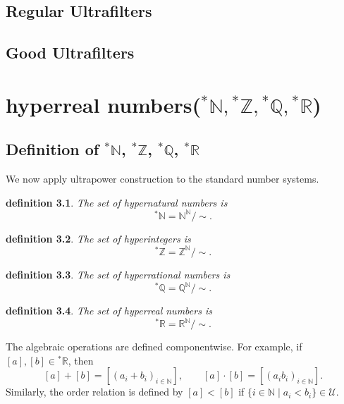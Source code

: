 \documentclass[10pt,a4paper]{book}
\newtheorem{definition}{definition}[section]
\begin{document}
\section{Regular Ultrafilters}

\section{Good Ultrafilters}


\chapter{hyperreal numbers($ {}^*\mathbb{N}  , {}^*\mathbb{Z}, {}^*\mathbb{Q} , {}^*\mathbb{R} $)  }


\section{Definition of ${}^\ast\mathbb{N}$, ${}^\ast\mathbb{Z}$, ${}^\ast\mathbb{Q}$,  ${}^\ast\mathbb{R}$ }


We now apply ultrapower  construction to the standard number systems.

\begin{definition}
    The set of hypernatural numbers is
    \[
        {}^\ast\mathbb{N}=\mathbb{N}^ \mathbb{N} /\sim.
    \]
\end{definition}

\begin{definition}
    The set of hyperintegers is
    \[
        {}^\ast\mathbb{Z}=\mathbb{Z}^ \mathbb{N} /\sim.
    \]
\end{definition}

\begin{definition}
    The set of hyperrational numbers is
    \[
        {}^\ast\mathbb{Q}=\mathbb{Q}^ \mathbb{N} /\sim.
    \]
\end{definition}

\begin{definition}
    The set of hyperreal numbers is
    \[
        {}^\ast\mathbb{R}=\mathbb{R}^ \mathbb{N} /\sim.
    \]
\end{definition}



The algebraic operations are defined componentwise. For example, if
$[a],[b]\in{}^\ast\mathbb{R}$, then
\[
    [a]+[b]=[(a_i+b_i)_{i\in \mathbb{N} }],
    \qquad
    [a]\cdot[b]=[(a_ib_i)_{i\in \mathbb{N} }].
\]
Similarly, the order relation is defined by
$
    [a]<[b]
$
if
$
    \{i\in \mathbb{N}  \mid a_i<b_i\}\in\mathcal{U}.
$
\end{document}
